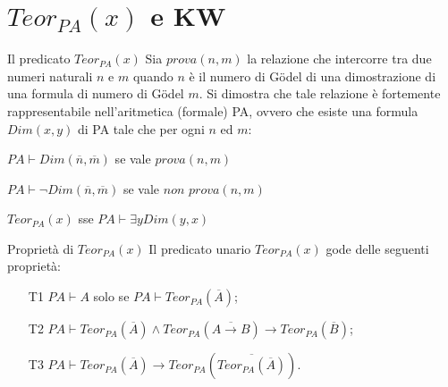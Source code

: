 \documentclass{beamer}
\begin{document}
\section{$Teor_{PA}(x)$ e KW}
\begin{frame}{Il predicato $Teor_{PA}(x)$} 
Sia $prova(n,m)$ la relazione che intercorre tra due numeri naturali $n$ e $m$ quando $n$ è il numero di Gödel di una dimostrazione di una formula di numero di Gödel $m$. Si dimostra che tale relazione è fortemente rappresentabile nell’aritmetica (formale) PA, ovvero che esiste una formula $Dim(x,y)$ di PA tale che per ogni $n$ ed $m$:
\begin{center}
    $PA \vdash Dim(\overline{n},\overline{m})$ se vale $prova (n, m)$

    $PA \vdash \neg Dim(\overline{n},\overline{m})$ se vale $non$ $prova (n, m)$
\end{center}
\begin{defn}
   \begin{center}
   $Teor_{PA}(x)$ sse $PA \vdash \exists y Dim(y,x)$
   \end{center}
\end{defn}
\end{frame}

\begin{frame}{Proprietà di $Teor_{PA}(x)$}
Il predicato unario $Teor_{PA}(x)$ gode delle seguenti proprietà:
\begin{exampleblock}{}
    \begin{itemize}
  \item[T1] $PA \vdash A$ solo se $PA \vdash Teor_{PA}(\overline{A})$;
  \item[T2] $PA \vdash Teor_{PA}(\overline{A}) \wedge Teor_{PA}(\overline{A\to B}) \to Teor_{PA}(\overline{B})$;
  \item[T3] $PA \vdash Teor_{PA}(\overline{A}) \to Teor_{PA}(\overline{Teor_{PA}(\overline{A})})$.
\end{itemize}
\end{exampleblock}
\end{frame}
\end{document}
